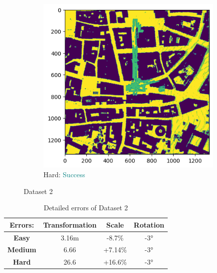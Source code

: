 \documentclass[11pt]{article}
\begin{document}
\begin{figure}[p]
        \vspace{1em}

        \begin{subfigure}{0.45\textwidth}
            \centering
            \includegraphics[width=\linewidth]{images/full/hard/4_1_3_hard}
            \caption{Hard: \textcolor{teal}{Success}}
            \label{fig:4_1_3_hard}
        \end{subfigure}
        \hfill

        \caption{Dataset 2}
        \label{fig:res_4_1_3}
    \end{figure}

    \begin{table}[p]
        \centering
        \begin{tabular}{|c|c|c|c|}
          \hline
          \textbf{Errors:} & \textbf{Transformation} & \textbf{Scale} & \textbf{Rotation} \\
          \hline
          \textbf{Easy}   & 3.16m & -8.7\%  & -3° \\
          \hline
          \textbf{Medium} & 6.66  & +7.14\% & -3° \\
          \hline
          \textbf{Hard}   & 26.6  & +16.6\% & -3° \\
          \hline
        \end{tabular}
        \caption{Detailed errors of Dataset 2}
        \label{tab:simpletable}
    \end{table}
\end{document}
